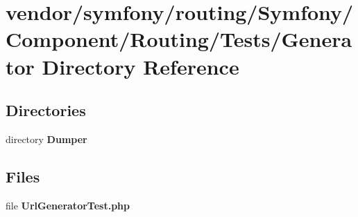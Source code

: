 \section{vendor/symfony/routing/\+Symfony/\+Component/\+Routing/\+Tests/\+Generator Directory Reference}
\label{dir_ab7e862d9b0f52f1967f592a20064f43}
\subsection*{Directories}
\begin{DoxyCompactItemize}
\item 
directory {\bf Dumper}
\end{DoxyCompactItemize}
\subsection*{Files}
\begin{DoxyCompactItemize}
\item 
file {\bf Url\+Generator\+Test.\+php}
\end{DoxyCompactItemize}
